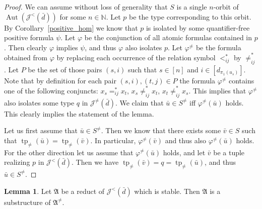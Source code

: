 \documentclass{amsart}
\theoremstyle{definition}
\newtheorem{lemma}[theorem]{Lemma}
\theoremstyle{remark}
\numberwithin{equation}{section}
\newcommand{\aut}{\operatorname{Aut}}
\newcommand{\typ}{\operatorname{tp}}
\newcommand\johnord[1]{\mathcal{J}^{<}(#1)}
\newcommand\johnneq[1]{\mathcal{J}^{\neq}(#1)}
\newcommand{\fa}{\mathfrak{A}}
\begin{document}
\begin{proof}
	We can assume without loss of generality that $S$ is a single $n$-orbit of $\aut(\johnord{\bar{d}})$ for some $n\in {\mathbb N}$. Let $p$ be the type corresponding to this orbit. By Corollary~\ref{positive_hom} we know that $p$ is isolated by some quantifier-free positive formula $\psi$. Let $\varphi$ be the conjunction of all atomic formulas contained in $p$. Then clearly $\varphi$ implies $\psi$, and thus $\varphi$ also isolates $p$. Let $\varphi^{\neq}$ be the formula obtained from $\varphi$ by replacing each occurrence of the relation symbol $<_{ij}^*$ by $\neq_{ij}^*$. Let $P$ be the set of those pairs $(s,i)$ such that $s\in [n]$ and $i\in [d_{\pi_1(u_s)}]$. Note that by definition for each pair $(s,i),(t,j)\in P$ the formula  $\varphi^{\neq}$ contains one of the following conjuncts: $x_s=_{ij}^*x_t$,  $x_s\neq_{ij}^*x_t$, $x_t\neq_{ij}^*x_s$. This implies that $\varphi^{\neq}$ also isolates some type $q$ in $\johnneq{\bar{d}}$. We claim that $\bar{u}\in S^{\neq}$ iff $\varphi^{\neq}(\bar{u})$ holds. This clearly implies the statement of the lemma.
	
	Let us first assume that $\bar{u}\in S^{\neq}$. Then we know that there exists some $\bar{v}\in S$ such that $\typ_{\neq}(\bar{u})=\typ_{\neq}(\bar{v})$. In particular, $\varphi^{\neq}(\bar{v})$ and thus also $\varphi^{\neq}(\bar{u})$ holds. For the other direction let us assume that $\varphi^{\neq}(\bar{u})$ holds, and let $\bar{v}$ be a tuple realizing $p$ in $\johnord{\bar{d}}$. Then we have $\typ_{\neq}(\bar{v})=q=\typ_{\neq}(\bar{u})$, and thus $\bar{u}\in S^{\neq}$.
\end{proof}

\begin{lemma}\label{remove_sub}
	Let $\fa$ be a reduct of
    $\johnord{\bar{d}}$ which is stable. Then $\fa$ is a substructure of $\fa^{\neq}$.
\end{lemma}
\end{document}
